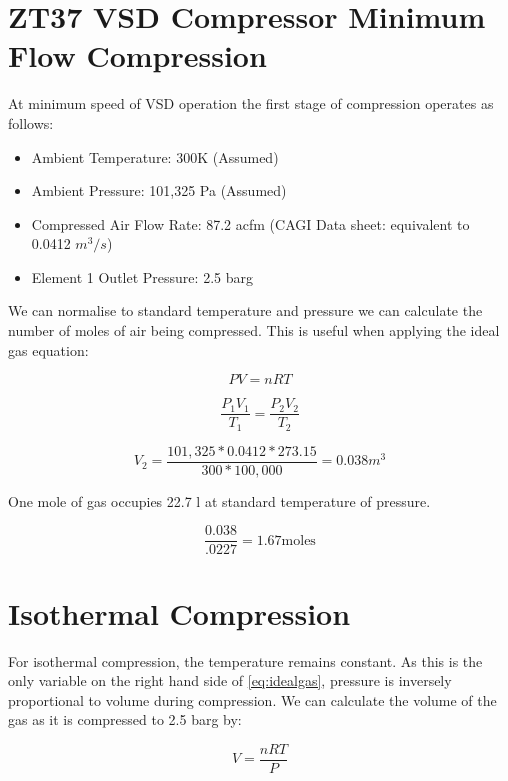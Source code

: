 \documentclass{article}
\begin{document}
\section{ZT37 VSD Compressor Minimum Flow Compression}
At minimum speed of VSD operation the first stage of compression operates as follows:

\begin{itemize}
\item Ambient Temperature: 300K (Assumed)
\item Ambient Pressure: 101,325 Pa (Assumed)
\item Compressed Air Flow Rate: 87.2 acfm (CAGI Data sheet: equivalent to 0.0412 $m^{3} / s$)
\item Element 1 Outlet Pressure: 2.5 barg
\end{itemize}

We can normalise to standard temperature and pressure we can calculate the number of moles of air being compressed. This is useful when applying the ideal gas equation:

\begin{equation}
PV = nRT
\label{eq:idealgas}
\end{equation}

\begin{equation}
\frac{P_{1}V_{1}}{T_{1}}  = \frac{P_{2}V_{2}}{T_{2}}
\label{eq:combinedgaslaw}
\end{equation}

\begin{equation}
V_{2} = \frac{101,325 * 0.0412 * 273.15}{300*100,000} = 0.038 m^{3}
\end{equation}

One mole of gas occupies 22.7 l at standard temperature of pressure.

\begin{equation}
\frac{0.038}{.0227} = 1.67 \text{moles}
\end{equation}

\section{Isothermal Compression}
For isothermal compression, the temperature remains constant. As this is the only variable on the right hand side of \autoref{eq:idealgas}, pressure is inversely proportional to volume during compression. We can calculate the volume of the gas as it is compressed to 2.5 barg by:

\begin{equation}
V = \frac{nRT}{P}
\end{equation}
\end{document}
